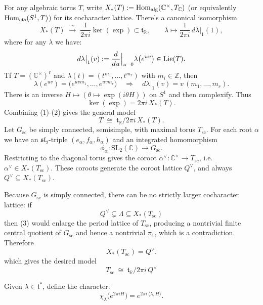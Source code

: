 \documentclass[12pt]{article}
\begin{document}
For any algebraic torus $T$, write $X_*(T):=\operatorname{Hom}_{\text{alg}}(\mathbb{C}^\times,T_\mathbb{C})$ (or equivalently $\operatorname{Hom}_{\text{cts}}(S^1,T)$) for its cocharacter lattice.
There's a canonical isomorphism
\[
    X_*(T)\;\xrightarrow{\ \sim\ }\;\frac{1}{2\pi i}\ker(\exp)\subset \mathfrak t_\mathbb{R},
    \qquad
    \lambda \longmapsto \frac{1}{2\pi i}\,d\lambda|_1(1),
\]
where for any $\lambda$ we have:
\[
    d\lambda\big|_{1}(v) := \frac{d}{du}\Big|_{u=0} \lambda \big(e^{u v}\big) \in \operatorname{Lie}(T).
\]
Tf $T=(\mathbb{C}^\times)^r$ and $\lambda(t)=(t^{m_1},\dots,t^{m_r})$ with $m_i\in\mathbb{Z}$, then
\[
    \lambda(e^{uv})=\big(e^{u v m_1},\dots,e^{u v m_r}\big) \quad\Rightarrow\quad
    d\lambda\big|_{1}(v)=v\,(m_1,\dots,m_r).
\]
There is an inverse $H\mapsto(\theta\mapsto \exp(i\theta H))$ on $S^1$ and then complexify. Thus
\[
    \ker(\exp)=2\pi i\,X_*(T). \tag{2}
\]
Combining (1)-(2) gives the general model
\[
    T\;\cong\;\mathfrak t_\mathbb{R}/2\pi i\,X_*(T). \tag{3}
\]
Let $G_{\mathrm{sc}}$ be simply connected, semisimple, with maximal torus $T_{\mathrm{sc}}$.
For each root $\alpha$ we have an $\mathfrak{sl}_2$-triple $(e_\alpha,f_\alpha,h_\alpha)$ and an integrated homomorphism
\[
    \phi_\alpha:\mathrm{SL}_2(\mathbb{C})\to G_{\mathrm{sc}}.
\]
Restricting to the diagonal torus gives the coroot $\alpha^\vee:\mathbb{C}^\times\to T_{\mathrm{sc}}$, i.e. $\alpha^\vee\in X_*(T_{\mathrm{sc}})$.
These coroots generate the coroot lattice $Q^\vee$, and always $Q^\vee\subseteq X_*(T_{\mathrm{sc}})$.

Because $G_{\mathrm{sc}}$ is simply connected, there can be no strictly larger cocharacter lattice: if \[Q^\vee\subsetneq \Lambda\subseteq X_*(T_{\mathrm{sc}})\] then (3) would enlarge the period lattice of $T_{\mathrm{sc}}$, producing a nontrivial finite central quotient of $G_{\mathrm{sc}}$ and hence a nontrivial $\pi_1$, which is a contradiction. Therefore
\[
    X_*(T_{\mathrm{sc}})=Q^\vee. \tag{4}
\]
which gives the desired model
\[
    T_{\mathrm{sc}}\ \cong\ \mathfrak t_\mathbb{R}\big/2\pi i\,Q^\vee
\]




Given $\lambda\in\mathfrak{t}^*$, define the character:
\[
    \chi_\lambda\big(e^{2\pi i H}\big) = e^{2\pi i\,\langle \lambda,H\rangle}.
\]
\end{document}
